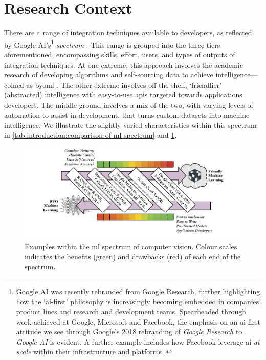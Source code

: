 \section{Research Context}
\label{sec:introduction:context}

There are a range of integration techniques available to developers, as reflected by Google AI's\footnote{
Google AI was recently rebranded from Google Research, further highlighting how the `\gls{ai}-first' philosophy is increasingly becoming embedded in companies' product lines and research and development teams. Spearheaded through work achieved at Google, Microsoft and Facebook, the emphasis on an \gls{ai}-first attitude we see through Google's 2018 rebranding of \textit{Google Research} to \textit{Google AI} \citep{Howard:2018tz} is evident. A further example includes how Facebook leverage \gls{ai} \textit{at scale} within their infrastructure and platforms \citep{Parekh:2017hx}.
} \textit{ spectrum} \citep{Ortiz:2017wg,LaForge:2018tm,McGowen:2019vt}. This range is grouped into the three tiers aforementioned, encompassing skills, effort, users, and types of outputs of integration techniques. At one extreme, this approach involves the academic research of developing algorithms and self-sourcing data to achieve intelligence---coined as \gls{byoml} \citep{Ortiz:2017wg,McGowen:2019vt,Jimerson:2017vh}. The other extreme involves off-the-shelf, `friendlier' (abstracted) intelligence with easy-to-use \glspl{api} targeted towards applications developers. The middle-ground involves a mix of the two, with varying levels of automation to assist in development, that turns custom datasets into machine intelligence. 
We illustrate the slightly varied characteristics within this spectrum in \cref{tab:introduction:comparison-of-ml-spectrum} and \cref{fig:introduction:cv-spectrum}.


\begin{figure}[p]
\centering
\includegraphics[width=\linewidth]{cv-spectrum}
\caption[The spectrum of machine learning]{Examples within the \gls{ml} spectrum of computer vision. Colour scales indicates the benefits (green) and drawbacks (red) of each end of the spectrum.}
\label{fig:introduction:cv-spectrum}
\end{figure}

